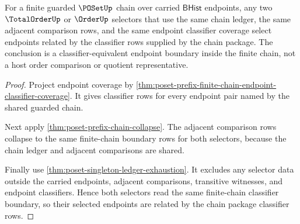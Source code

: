 \begin{theorem}
\label{thm:poset-prefix-selector-classifier-determinacy}
For a finite guarded $\POSetUp$ chain over carried $\mathsf{BHist}$ endpoints,
any two $\TotalOrderUp$ or $\OrderUp$ selectors that use the same chain ledger,
the same adjacent comparison rows, and the same endpoint classifier coverage
select endpoints related by the classifier rows supplied by the chain package.
The conclusion is a classifier-equivalent endpoint boundary inside the finite
chain, not a host order comparison or quotient representative.
\end{theorem}
\begin{proof}
Project endpoint coverage by
\autoref{thm:poset-prefix-finite-chain-endpoint-classifier-coverage}. It gives
classifier rows for every endpoint pair named by the shared guarded chain.

Next apply \autoref{thm:poset-prefix-chain-collapse}. The adjacent comparison
rows collapse to the same finite-chain boundary rows for both selectors,
because the chain ledger and adjacent comparisons are shared.

Finally use \autoref{thm:poset-singleton-ledger-exhaustion}. It excludes any
selector data outside the carried endpoints, adjacent comparisons, transitive
witnesses, and endpoint classifiers. Hence both selectors read the same
finite-chain classifier boundary, so their selected endpoints are related by
the chain package classifier rows.
\end{proof}
